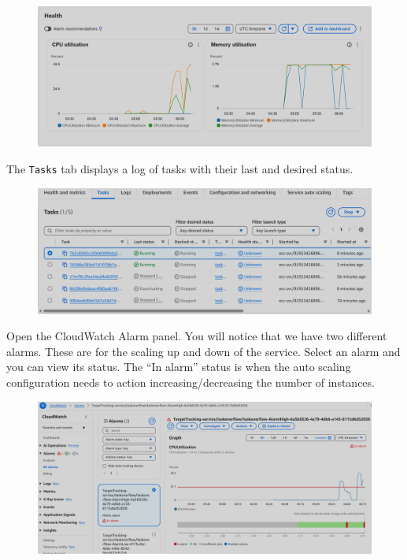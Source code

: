 \documentclass{csse4400}
\begin{document}
\begin{figure}[H]
  \begin{center}
    \includegraphics[width=\textwidth]{images/ecs-panel-health}
  \end{center}
\end{figure}

\newpage
The \texttt{Tasks} tab displays a log of tasks with their last and desired status.

\begin{figure}[H]
  \begin{center}
    \includegraphics[width=\textwidth]{images/ecs-panel-tasks}
  \end{center}
\end{figure}

Open the CloudWatch Alarm panel.
You will notice that we have two different alarms.
These are for the scaling up and down of the service.
Select an alarm and you can view its status.
The ``In alarm'' status is when the auto scaling configuration needs to action
increasing/decreasing the number of instances.

\begin{figure}[H]
  \begin{center}
    \includegraphics[width=\textwidth]{images/cloudwatch-in-alarm}
  \end{center}
\end{figure}
\end{document}
